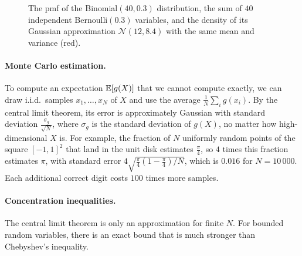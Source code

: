 \begin{figure}[ht]
    \centering
    \caption{The pmf of the Binomial$(40, 0.3)$ distribution, the sum of $40$ independent Bernoulli$(0.3)$ variables, and the density of its Gaussian approximation $\mathcal{N}(12, 8.4)$ with the same mean and variance (red).}
    \label{L4-fig:clt}
\end{figure}

\paragraph{Monte Carlo estimation.} To compute an expectation $\mathbb{E}[g(X)]$ that we cannot compute exactly, we can draw i.i.d.\ samples $x_1, \ldots, x_N$ of $X$ and use the average $\frac{1}{N}\sum_i g(x_i)$. By the central limit theorem, its error is approximately Gaussian with standard deviation $\frac{\sigma_g}{\sqrt{N}}$, where $\sigma_g$ is the standard deviation of $g(X)$, no matter how high-dimensional $X$ is. For example, the fraction of $N$ uniformly random points of the square $[-1, 1]^2$ that land in the unit disk estimates $\frac{\pi}{4}$, so $4$ times this fraction estimates $\pi$, with standard error $4\sqrt{\frac{\pi}{4}(1 - \frac{\pi}{4})/N}$, which is $0.016$ for $N = 10\,000$. Each additional correct digit costs $100$ times more samples.

\paragraph{Concentration inequalities.} The central limit theorem is only an approximation for finite $N$. For bounded random variables, there is an exact bound that is much stronger than Chebyshev's inequality.

